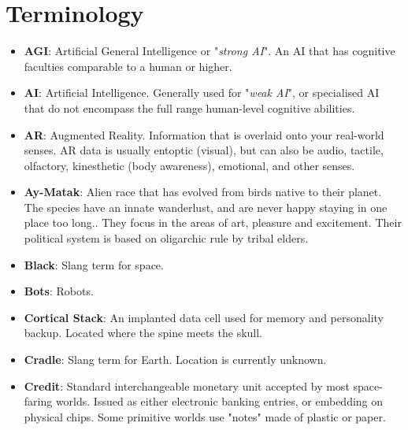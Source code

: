 \documentclass[10pt,twoside]{article}
\begin{document}

\section{Terminology}

\begin{multicols}{2}

\begin{itemize}

\item \textbf{AGI}: Artificial General Intelligence or "\textit{strong AI}". An AI that has cognitive faculties comparable to a human or higher.

\item \textbf{AI}: Artificial Intelligence. Generally used for "\textit{weak AI}", or specialised AI that do not encompass the full range human-level cognitive abilities.

\item \textbf{AR}: Augmented Reality. Information that is overlaid onto your real-world senses. AR data is usually entoptic (visual), but can also be audio, tactile, olfactory, kinesthetic (body awareness), emotional, and other senses.

\item \textbf{Ay-Matak}: Alien race that has evolved from birds native to their planet. The species have an innate wanderlust, and are never happy staying in one place too long.. They focus in the areas of art, pleasure and excitement. Their political system is based on oligarchic rule by tribal elders.

\item \textbf{Black}: Slang term for space.

\item \textbf{Bots}: Robots.

\item \textbf{Cortical Stack}: An implanted data cell used for memory and personality backup. Located where the spine meets the skull.

\item \textbf{Cradle}: Slang term for Earth. Location is currently unknown.

\item \textbf{Credit}: Standard interchangeable monetary unit accepted by most space-faring worlds. Issued as either electronic banking entries, or embedding on physical chips. Some primitive worlds use "notes" made of plastic or paper.


\end{itemize}
\end{multicols}
\end{document}
